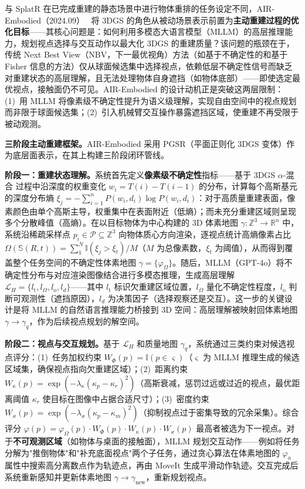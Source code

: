 与 SplatR 在已完成重建的静态场景中进行物体重排的任务设定不同，AIR-Embodied（2024.09）~\cite{2409_16019} 将 3DGS 的角色从被动场景表示前置为\textbf{主动重建过程的优化目标}——其核心问题是：如何利用多模态大语言模型（MLLM）的高层推理能力，规划视点选择与交互动作以最大化 3DGS 的重建质量？该问题的瓶颈在于，传统 Next Best View（NBV，下一最优视角）方法（如基于不确定性的和基于 Fisher 信息的方法）仅从球面候选集中选择视点，依赖低层不确定性信号而缺乏对重建状态的高层理解，且无法处理物体自身遮挡（如物体底部）——即使选定最优视点，接触面仍不可见。AIR-Embodied 的设计动机正是突破这两层限制：(1)~用 MLLM 将像素级不确定性提升为语义级理解，实现自由空间中的视点规划而非限于球面候选集；(2)~引入机械臂交互操作暴露遮挡区域，使重建不再受限于被动观测。

\textbf{三阶段主动重建框架。}AIR-Embodied 采用 PGSR（平面正则化 3DGS 变体）作为底层面表示，在其上构建三阶段闭环管线。

\textbf{阶段一：重建状态理解。}系统首先定义\textbf{像素级不确定性}指标——基于 3DGS $\alpha$-混合 过程中沿深度的权重变化 $w_i = T(i) - T(i-1)$ 的分布，计算每个高斯基元的深度分布熵 $\xi_j = -\sum_{i=1}^{n} P(w_i, d_i) \log P(w_i, d_i)$：对于高质量重建表面，像素颜色由单个高斯主导，权重集中在表面附近（低熵）；而未充分重建区域则呈现多个分散峰值（高熵）。在以目标物体为中心构建的 3D 体素地图 $\gamma: \mathbb{Z}^3 \to \mathbb{R}^n$ 中，系统沿稀疏采样点 $p_i \in \mathcal{P} \subseteq \mathbb{Z}^3$ 向物体质心方向渲染，逐视点统计高熵像素占比 $\Omega(\mathbb{S}(R,t)) = \sum_1^N \mathbb{I}(\xi_j > \xi_t) / M$（$M$ 为总像素数，$\xi_t$ 为阈值），从而得到覆盖整个任务空间的不确定性体素地图 $\gamma = \{\varphi_\Omega\}$。随后，MLLM（GPT-4o）将不确定性分布与对应渲染图像结合进行多模态推理，生成高层理解 $\mathcal{L}_H = \{l_\text{t}, l_\Omega, l_\text{o}, l_d\}$——其中 $l_\text{t}$ 标识欠重建区域位置，$l_\Omega$ 量化不确定性程度，$l_\text{o}$ 判断可观测性（遮挡原因），$l_d$ 为决策因子（选择观察还是交互）。这一步的关键设计是将 MLLM 的自然语言推理能力桥接到 3D 空间：高层理解被映射回体素地图 $\gamma \to \gamma_q$，作为后续视点规划的解空间。

\textbf{阶段二：视点与交互规划。}基于 $\mathcal{L}_H$ 和质量地图 $\gamma_q$，系统通过三类约束对候选视点评分：(1)~任务加权约束 $W_\Phi(p) = \mathbb{I}(p \in \varsigma)$（$\varsigma$ 为 MLLM 推理生成的候选区域集，确保视点指向欠重建区域）；(2)~距离约束 $W_\kappa(p) = \exp(-\lambda_\kappa(\kappa_p - \kappa_r)^2)$（高斯衰减，惩罚过远或过近的视点，最优距离阈值 $\kappa_r$ 使目标在图像中占据合适尺寸）；(3)~密度约束 $W_\varkappa(p) = \exp(-\lambda_\varkappa(\kappa_p - \kappa_m)^2)$（抑制视点过于密集导致的冗余采集）。综合评分 $\varphi(p) = \varphi_\Omega(p) \cdot W_\Phi(p) \cdot W_\kappa(p) \cdot W_\varkappa(p)$ 最高者被选为下一视点。对于\textbf{不可观测区域}（如物体与桌面的接触面），MLLM 规划交互动作——例如将任务分解为"推倒物体"和"补充底面视点"两个子任务，通过贪心算法在体素地图的 $\varphi_a$ 属性中搜索高分离数点作为轨迹点，再由 MoveIt 生成平滑动作轨迹。交互完成后系统重新感知并更新体素地图 $\gamma \to \gamma_\text{new}$，重新规划视点。

